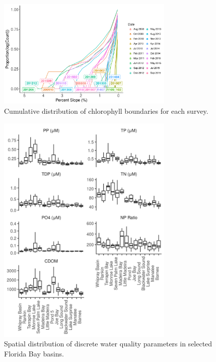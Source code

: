 \clearpage

\begin{figure}
  \centering
  \includegraphics[width=0.75\textwidth]{../../figures/boundaries.png}
  \caption{Cumulative distribution of chlorophyll boundaries for each survey.}
  \label{fig:6}
\end{figure}

\clearpage



\clearpage

\begin{figure}
  \centering
  \includegraphics[width=0.75\textwidth]{../../figures/nonchlboxplot.png}
  \caption{Spatial distribution of discrete water quality parameters in selected Florida Bay basins.}
  \label{fig:7}
\end{figure}

